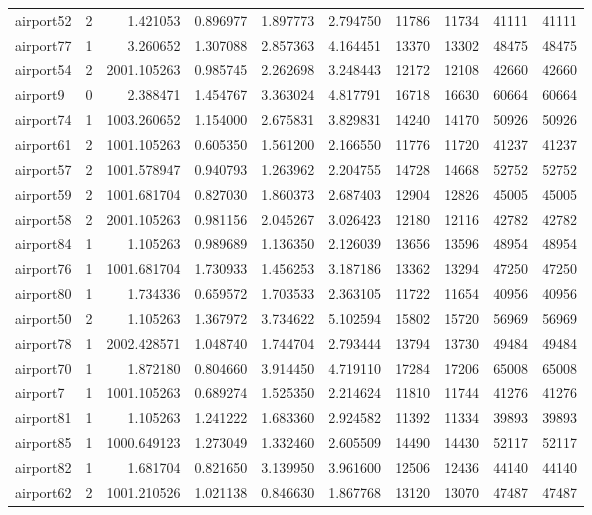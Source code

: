 \begin{longtable}{|l|r|r|r|r|r|r|r|r|r|}
airport52 & 2 & 1.421053 & 0.896977 & 1.897773 & 2.794750 & 11786 & 11734 & 41111 & 41111 \\
airport77 & 1 & 3.260652 & 1.307088 & 2.857363 & 4.164451 & 13370 & 13302 & 48475 & 48475 \\
airport54 & 2 & 2001.105263 & 0.985745 & 2.262698 & 3.248443 & 12172 & 12108 & 42660 & 42660 \\
airport9 & 0 & 2.388471 & 1.454767 & 3.363024 & 4.817791 & 16718 & 16630 & 60664 & 60664 \\
airport74 & 1 & 1003.260652 & 1.154000 & 2.675831 & 3.829831 & 14240 & 14170 & 50926 & 50926 \\
airport61 & 2 & 1001.105263 & 0.605350 & 1.561200 & 2.166550 & 11776 & 11720 & 41237 & 41237 \\
airport57 & 2 & 1001.578947 & 0.940793 & 1.263962 & 2.204755 & 14728 & 14668 & 52752 & 52752 \\
airport59 & 2 & 1001.681704 & 0.827030 & 1.860373 & 2.687403 & 12904 & 12826 & 45005 & 45005 \\
airport58 & 2 & 2001.105263 & 0.981156 & 2.045267 & 3.026423 & 12180 & 12116 & 42782 & 42782 \\
airport84 & 1 & 1.105263 & 0.989689 & 1.136350 & 2.126039 & 13656 & 13596 & 48954 & 48954 \\
airport76 & 1 & 1001.681704 & 1.730933 & 1.456253 & 3.187186 & 13362 & 13294 & 47250 & 47250 \\
airport80 & 1 & 1.734336 & 0.659572 & 1.703533 & 2.363105 & 11722 & 11654 & 40956 & 40956 \\
airport50 & 2 & 1.105263 & 1.367972 & 3.734622 & 5.102594 & 15802 & 15720 & 56969 & 56969 \\
airport78 & 1 & 2002.428571 & 1.048740 & 1.744704 & 2.793444 & 13794 & 13730 & 49484 & 49484 \\
airport70 & 1 & 1.872180 & 0.804660 & 3.914450 & 4.719110 & 17284 & 17206 & 65008 & 65008 \\
airport7 & 1 & 1001.105263 & 0.689274 & 1.525350 & 2.214624 & 11810 & 11744 & 41276 & 41276 \\
airport81 & 1 & 1.105263 & 1.241222 & 1.683360 & 2.924582 & 11392 & 11334 & 39893 & 39893 \\
airport85 & 1 & 1000.649123 & 1.273049 & 1.332460 & 2.605509 & 14490 & 14430 & 52117 & 52117 \\
airport82 & 1 & 1.681704 & 0.821650 & 3.139950 & 3.961600 & 12506 & 12436 & 44140 & 44140 \\
airport62 & 2 & 1001.210526 & 1.021138 & 0.846630 & 1.867768 & 13120 & 13070 & 47487 & 47487 \\

\end{longtable}
